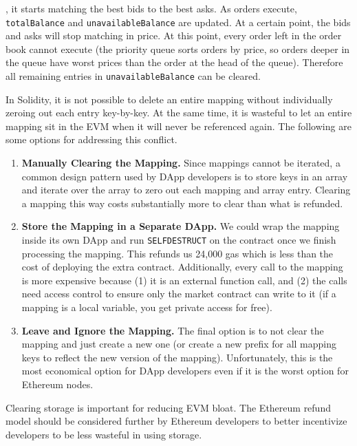 , it starts matching the best bids to the best asks. As orders execute, \texttt{totalBalance} and \texttt{unavailableBalance} are updated. At a certain point, the bids and asks will stop matching in price. At this point, every order left in the order book cannot execute (the priority queue sorts orders by price, so orders deeper in the queue have worst prices than the order at the head of the queue). Therefore all remaining entries in \texttt{unavailableBalance} can be cleared.

In Solidity, it is not possible to delete an entire mapping without individually zeroing out each entry key-by-key. At the same time, it is wasteful to let an entire mapping sit in the EVM when it will never be referenced again. The following are some options for addressing this conflict.

\begin{enumerate}

\item \textbf{Manually Clearing the Mapping.} Since mappings cannot be iterated, a common design pattern used by DApp developers is to store keys in an array and iterate over the array to zero out each mapping and array entry. Clearing a mapping this way costs substantially more to clear than what is refunded.

\item \textbf{Store the Mapping in a Separate DApp.} We could wrap the mapping inside its own DApp and run \texttt{SELFDESTRUCT} on the contract once we finish processing the mapping. This refunds us 24,000 gas which is less than the cost of deploying the extra contract. Additionally, every call to the mapping is more expensive because (1) it is an external function call, and (2) the calls need access control to ensure only the market contract can write to it (if a mapping is a local variable, you get private access for free). 

\item \textbf{Leave and Ignore the Mapping.} The final option is to not clear the mapping and just create a new one (or create a new prefix for all mapping keys to reflect the new version of the mapping). Unfortunately, this is the most economical option for DApp developers even if it is the worst option for Ethereum nodes. 

\end{enumerate}

Clearing storage is important for reducing EVM bloat. The Ethereum refund model should be considered further by Ethereum developers to better incentivize developers to be less wasteful in using storage. 

